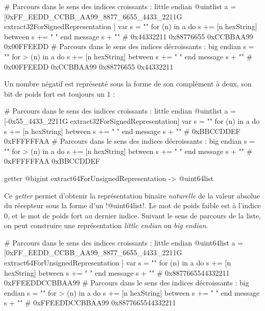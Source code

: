 \begin{galgas}
# Parcours dans le sens des indices croissants : little endian
@uintlist a = [0xFF_EEDD_CCBB_AA99_8877_6655_4433_2211G
  extract32ForSignedRepresentation
]
var s = ""
for (n) in a
  do s += [n hexString]
  between s += " "
end
message s + "\n" # 0x44332211 0x88776655 0xCCBBAA99 0x00FFEEDD
# Parcours dans le sens des indices décroissants : big endian
s = ""
for > (n) in a
  do s += [n hexString]
  between s += " "
end
message s + "\n" # 0x00FFEEDD 0xCCBBAA99 0x88776655 0x44332211
\end{galgas}

Un nombre négatif est représenté sous la forme de son complément à deux, son bit de poids fort est toujours un $1$ : 

\begin{galgas}
# Parcours dans le sens des indices croissants : little endian
@uintlist a = [-0x55_4433_2211G extract32ForSignedRepresentation]
var s = ""
for (n) in a
  do s += [n hexString]
  between s += " "
end
message s + "\n" # 0xBBCCDDEF 0xFFFFFFAA
# Parcours dans le sens des indices décroissants : big endian
s = ""
for > (n) in a
  do s += [n hexString]
  between s += " "
end
message s + "\n" # 0xFFFFFFAA 0xBBCCDDEF
\end{galgas}






\begin{galgas}
getter @bigint extract64ForUnsignedRepresentation -> @uint64list
\end{galgas}

Ce \emph{getter} permet d'obtenir la représentation binaire \emph{naturelle} de la valeur absolue du récepteur sous la forme d'un \ggs!@uint64list!. Le mot de poids faible est à l'indice $0$, et le mot de poids fort au dernier indice. Suivant le sens de parcours de la liste, on peut construire une représentation \emph{little endian} ou \emph{big endian}.

\begin{galgas}
# Parcours dans le sens des indices croissants : little endian
@uint64list a = [0xFF_EEDD_CCBB_AA99_8877_6655_4433_2211G
  extract64ForUnsignedRepresentation
]
var s = ""
for (n) in a
  do s += [n hexString]
  between s += " "
end
message s + "\n" # 0x8877665544332211 0xFFEEDDCCBBAA99
# Parcours dans le sens des indices décroissants : big endian
s = ""
for > (n) in a
  do s += [n hexString]
  between s += " "
end
message s + "\n" # 0xFFEEDDCCBBAA99 0x8877665544332211
\end{galgas}

